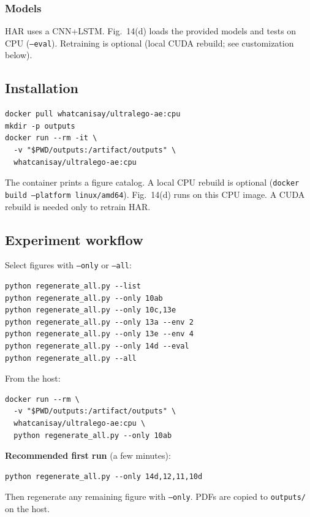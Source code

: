\documentclass[10pt,twocolumn]{article}
\begin{document}
\subsubsection{Models}

HAR uses a CNN+LSTM. Fig.~14(d) loads the provided models and tests
on CPU (\texttt{--eval}). Retraining is optional (local CUDA rebuild;
see customization below).

\subsection{Installation}

\begin{lstlisting}
docker pull whatcanisay/ultralego-ae:cpu
mkdir -p outputs
docker run --rm -it \
  -v "$PWD/outputs:/artifact/outputs" \
  whatcanisay/ultralego-ae:cpu
\end{lstlisting}

The container prints a figure catalog. A local CPU rebuild is optional
(\texttt{docker build --platform linux/amd64}).
Fig.~14(d) runs on this CPU image. A CUDA rebuild is needed only to
retrain HAR.

\subsection{Experiment workflow}

Select figures with \texttt{--only} or \texttt{--all}:

\begin{lstlisting}
python regenerate_all.py --list
python regenerate_all.py --only 10ab
python regenerate_all.py --only 10c,13e
python regenerate_all.py --only 13a --env 2
python regenerate_all.py --only 13e --env 4
python regenerate_all.py --only 14d --eval
python regenerate_all.py --all
\end{lstlisting}

From the host:

\begin{lstlisting}
docker run --rm \
  -v "$PWD/outputs:/artifact/outputs" \
  whatcanisay/ultralego-ae:cpu \
  python regenerate_all.py --only 10ab
\end{lstlisting}

\noindent\textbf{Recommended first run} (a few minutes):
\begin{lstlisting}
python regenerate_all.py --only 14d,12,11,10d
\end{lstlisting}
Then regenerate any remaining figure with \texttt{--only}.
PDFs are copied to \texttt{outputs/} on the host.
\end{document}
